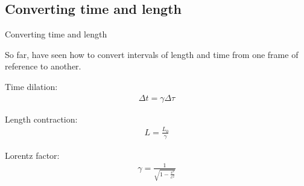 \documentclass[aspectratio=169,
hyperref={colorlinks,urlcolor=blue}
]{beamer}
\begin{document}
\begin{frame}
\titlepage
\thispagestyle{empty}
\end{frame}







\subsection{Converting time and length}
\label{subsec:convertingtimeandlength}
\begin{bulletframe}{Converting time and length}
\item So far, have seen how to convert intervals of length and time from one frame of reference to another.
\item Time dilation:
\begin{align*}
\Delta t =\gamma \Delta \tau
\end{align*}
\item Length contraction:
\begin{align*}
L =\frac{L_0}{\gamma}
\end{align*}
\item Lorentz factor:
\begin{align*}
\gamma =\frac{1}{\sqrt{1-\frac{v^2}{c^2}}}
\end{align*}
\end{bulletframe}

\end{document}
